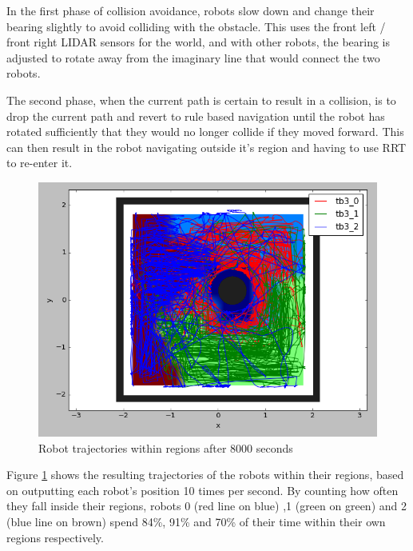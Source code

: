 \documentclass[a4paper, 10pt, conference]{ieeeconf}      %
\begin{document}
In the first phase of collision avoidance, robots slow down and change their bearing slightly to avoid colliding with the obstacle. This uses the front left / front right LIDAR sensors for the world, and with other robots, the bearing is adjusted to rotate away from the imaginary line that would connect the two robots.

The second phase, when the current path is certain to result in a collision, is to drop the current path and revert to rule based navigation until the robot has rotated sufficiently that they would no longer collide if they moved forward. This can then result in the robot navigating outside it's region and having to use RRT to re-enter it.

\begin{figure}
	\includegraphics[width=\columnwidth]{dec_t2_cover.png}
	\caption{Robot trajectories within regions after 8000 seconds}
    \label{fig:decCover}
\end{figure}


Figure \ref{fig:decCover} shows the resulting trajectories of the robots within their regions, based on outputting each robot's position 10 times per second. By counting how often they fall inside their regions, robots 0 (red line on blue) ,1 (green on green) and 2 (blue line on brown) spend 84\%, 91\% and 70\% of their time within their own regions respectively.
\end{document}
